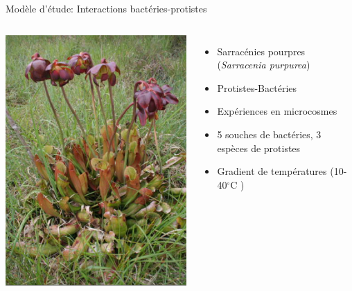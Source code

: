 \documentclass[11pt, compress, aspectratio=1610]{beamer}
\providecommand{\tightlist}{%
  \setlength{\itemsep}{0pt}\setlength{\parskip}{0pt}}
\newcommand{\begincols}{\begin{columns}}
\newcommand{\stopcols}{\end{columns}}
\begin{document}
\begin{frame}{Modèle d'étude: Interactions bactéries-protistes}

\begincols
{}

\centering  \includegraphics[width=0.7\linewidth]{figuresAz/pitcher.jpg}

\hfill{}

\begin{itemize}
\tightlist
\item
  Sarracénies pourpres (\textit{Sarracenia purpurea})
\item
  Protistes-Bactéries
\item
  Expériences en microcosmes
\item
  5 souches de bactéries, 3 espèces de protistes
\item
  Gradient de températures (10-40\(^\circ\)C )
\end{itemize}

\stopcols

\end{frame}
\end{document}
